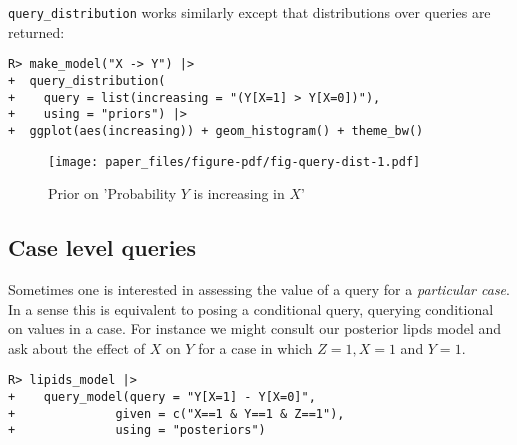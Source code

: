 \documentclass[
  11pt,
  article]{jss}
\begin{document}
\texttt{query\_distribution} works similarly except that distributions
over queries are returned:

\begin{verbatim}
R> make_model("X -> Y") |> 
+  query_distribution(
+    query = list(increasing = "(Y[X=1] > Y[X=0])"), 
+    using = "priors") |>
+  ggplot(aes(increasing)) + geom_histogram() + theme_bw()
\end{verbatim}

\begin{figure}[t]

{\centering \texttt{[image: paper\_files/figure-pdf/fig-query-dist-1.pdf]}

}

\caption{\label{fig-query-dist}Prior on 'Probability \(Y\) is increasing
in \(X\)'}

\end{figure}

\hypertarget{case-level-queries}{%
\subsection{Case level queries}\label{case-level-queries}}

Sometimes one is interested in assessing the value of a query for a
\emph{particular case}. In a sense this is equivalent to posing a
conditional query, querying conditional on values in a case. For
instance we might consult our posterior lipds model and ask about the
effect of \(X\) on \(Y\) for a case in which \(Z=1, X=1\) and \(Y=1\).

\begin{verbatim}
R> lipids_model |>
+    query_model(query = "Y[X=1] - Y[X=0]",
+              given = c("X==1 & Y==1 & Z==1"),
+              using = "posteriors")
\end{verbatim}

\hypertarget{tbl-case-level-query}{}
\begin{table}[!h]
\caption{\label{tbl-case-level-query}Case Level Quiry Example. }\tabularnewline

\centering
{}
\end{table}
\end{document}
